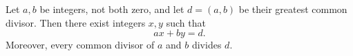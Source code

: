 Let $a, b$ be integers, not both zero, and let $d = (a, b)$ be their greatest common divisor. Then there exist integers $x, y$ such that
$$ax + by = d.$$
Moreover, every common divisor of $a$ and $b$ divides $d$.
